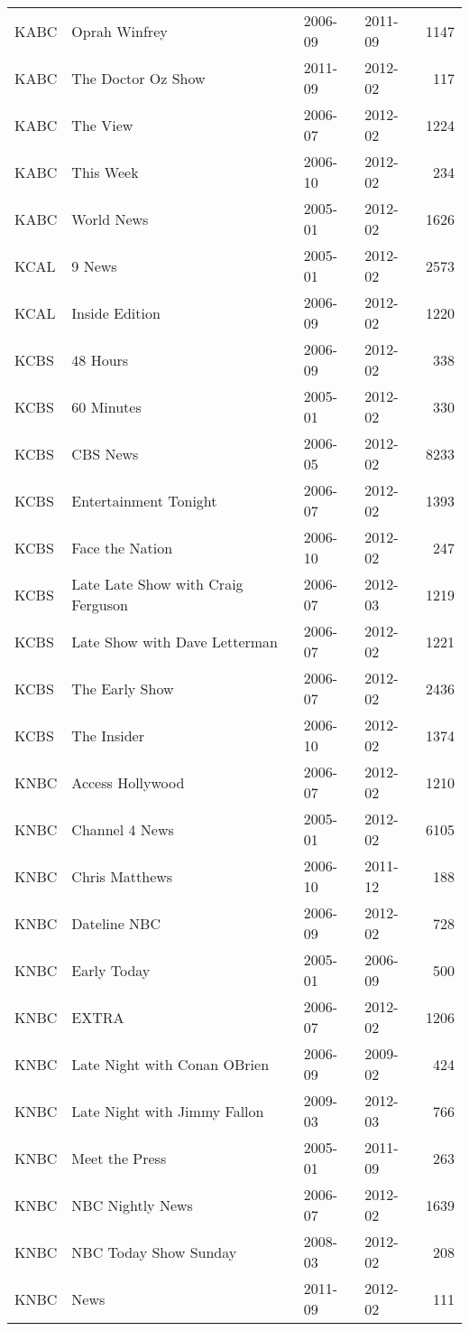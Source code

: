 \begin{table}[ht]
\begin{tabular}{llllr}
  KABC & Oprah Winfrey & 2006-09 & 2011-09 & 1147 \\ 
  KABC & The Doctor Oz Show & 2011-09 & 2012-02 & 117 \\ 
  KABC & The View & 2006-07 & 2012-02 & 1224 \\ 
  KABC & This Week & 2006-10 & 2012-02 & 234 \\ 
  KABC & World News & 2005-01 & 2012-02 & 1626 \\ 
  KCAL & 9 News  & 2005-01 & 2012-02 & 2573 \\ 
  KCAL & Inside Edition & 2006-09 & 2012-02 & 1220 \\ 
  KCBS & 48 Hours & 2006-09 & 2012-02 & 338 \\ 
  KCBS & 60 Minutes & 2005-01 & 2012-02 & 330 \\ 
  KCBS & CBS News & 2006-05 & 2012-02 & 8233 \\ 
  KCBS & Entertainment Tonight & 2006-07 & 2012-02 & 1393 \\ 
  KCBS & Face the Nation & 2006-10 & 2012-02 & 247 \\ 
  KCBS & Late Late Show with Craig Ferguson & 2006-07 & 2012-03 & 1219 \\ 
  KCBS & Late Show with Dave Letterman & 2006-07 & 2012-02 & 1221 \\ 
  KCBS & The Early Show & 2006-07 & 2012-02 & 2436 \\ 
  KCBS & The Insider & 2006-10 & 2012-02 & 1374 \\ 
  KNBC & Access Hollywood & 2006-07 & 2012-02 & 1210 \\ 
  KNBC & Channel 4 News & 2005-01 & 2012-02 & 6105 \\ 
  KNBC & Chris Matthews & 2006-10 & 2011-12 & 188 \\ 
  KNBC & Dateline NBC & 2006-09 & 2012-02 & 728 \\ 
  KNBC & Early Today & 2005-01 & 2006-09 & 500 \\ 
  KNBC & EXTRA & 2006-07 & 2012-02 & 1206 \\ 
  KNBC & Late Night with Conan OBrien & 2006-09 & 2009-02 & 424 \\ 
  KNBC & Late Night with Jimmy Fallon & 2009-03 & 2012-03 & 766 \\ 
  KNBC & Meet the Press & 2005-01 & 2011-09 & 263 \\ 
  KNBC & NBC Nightly News & 2006-07 & 2012-02 & 1639 \\ 
  KNBC & NBC Today Show Sunday & 2008-03 & 2012-02 & 208 \\ 
  KNBC & News  & 2011-09 & 2012-02 & 111 \\ 

\end{tabular}
\end{table}
